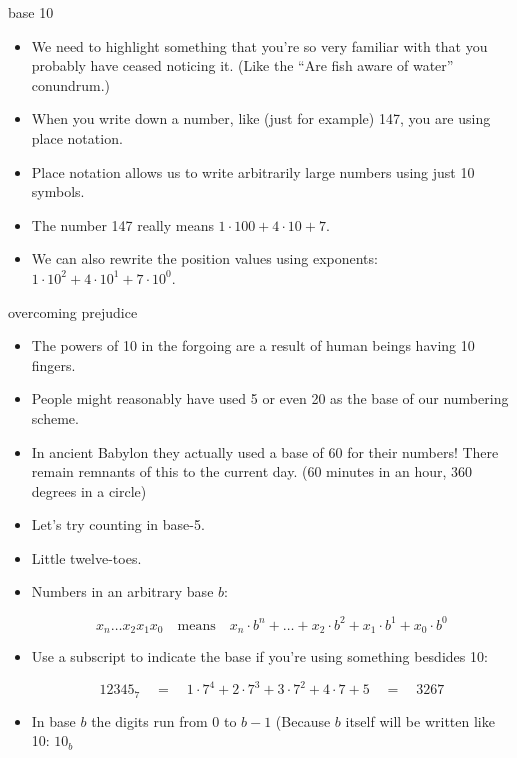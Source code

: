 \documentclass[landscape]{beamer}
\begin{document}
\begin{frame}{base 10}
\begin{itemize}
\item We need to highlight something that you're so very familiar with that you probably have ceased noticing it.  (Like the ``Are fish aware of water'' conundrum.) \pause
\item When you write down a number, like (just for example) 147, you are using place notation. \pause
\item Place notation allows us to write arbitrarily large numbers using just 10 symbols. \pause
\item The number 147 really means $1\cdot 100 + 4\cdot 10 + 7$. \pause
\item We can also rewrite the position values using exponents: $1\cdot 10^2 + 4\cdot 10^1 + 7\cdot 10^0$.\pause
\end{itemize}
\end{frame}

\begin{frame}{overcoming prejudice}
\begin{itemize}
\item The powers of 10 in the forgoing are a result of human beings having 10 fingers. \pause
\item People might reasonably have used 5 or even 20 as the base of our numbering scheme. \pause
\item In ancient Babylon they actually used a base of 60 for their numbers!  There remain remnants of this to the current day.  (60 minutes in an hour, 360 degrees in a circle\textellipsis) \pause
\end{itemize}
\end{frame}

\begin{frame}{}
\begin{itemize}
\item Let's try counting in base-5. \pause
\item Little twelve-toes. \pause
\item Numbers in an arbitrary base $b$:

\[ x_n \ldots x_2 x_1 x_0 \quad \mbox{means} \quad x_n\cdot b^n + \ldots + x_2\cdot b^2 + x_1 \cdot b^1 + x_0 \cdot b^0 \]
\pause

\item Use a subscript to indicate the base if you're using something besdides 10: 

\[ 12345_7 \quad = \quad 1\cdot 7^4 + 2\cdot 7^3 + 3\cdot 7^2 + 4\cdot 7 + 5 \quad = \quad 3267 \]

\pause

\item In base $b$ the digits run from 0 to $b-1$ (Because $b$ itself will be written like 10: $10_b$ \pause  

\end{itemize}
\end{frame}
\end{document}
